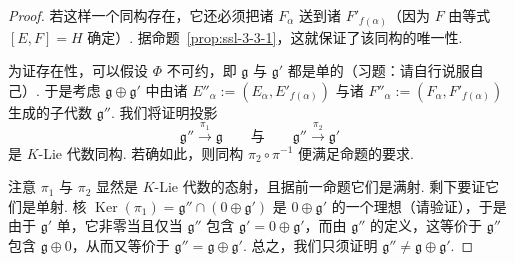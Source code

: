 \begin{proof}
若这样一个同构存在，它还必须把诸 $F_{\alpha}$ 送到诸 $F'_{f(\alpha)}$（因为 $F$ 由等式 $[E,F]=H$ 确定）. 据命题~\ref{prop:ssl-3-3-1}，这就保证了该同构的唯一性.

为证存在性，可以假设 $\Phi$ 不可约，即 $\mathfrak g$ 与 $\mathfrak g'$ 都是单的（习题：请自行说服自己）. 于是考虑 $\mathfrak g\oplus\mathfrak g'$ 中由诸 $E''_{\alpha}:=(E_{\alpha},E'_{f(\alpha)})$ 与诸 $F''_{\alpha}:=(F_{\alpha},F'_{f(\alpha)})$ 生成的子代数 $\mathfrak g''$. 我们将证明投影
\[\mathfrak g''\xrightarrow{\ \pi_1\ }\mathfrak g\qquad\text{与}\qquad\mathfrak g''\xrightarrow{\ \pi_2\ }\mathfrak g'\]
是 $K$-Lie 代数同构. 若确如此，则同构 $\pi_2\circ\pi^{-1}$ 便满足命题的要求.

注意 $\pi_1$ 与 $\pi_2$ 显然是 $K$-Lie 代数的态射，且据前一命题它们是满射. 剩下要证它们是单射. 核 $\operatorname{Ker}(\pi_1)=\mathfrak g''\cap(0\oplus\mathfrak g')$ 是 $0\oplus\mathfrak g'$ 的一个理想（请验证），于是由于 $\mathfrak g'$ 单，它非零当且仅当 $\mathfrak g''$ 包含 $\mathfrak g'=0\oplus\mathfrak g'$，而由 $\mathfrak g''$ 的定义，这等价于 $\mathfrak g''$ 包含 $\mathfrak g\oplus 0$，从而又等价于 $\mathfrak g''=\mathfrak g\oplus\mathfrak g'$. 总之，我们只须证明 $\mathfrak g''\neq\mathfrak g\oplus\mathfrak g'$.


\end{proof}
